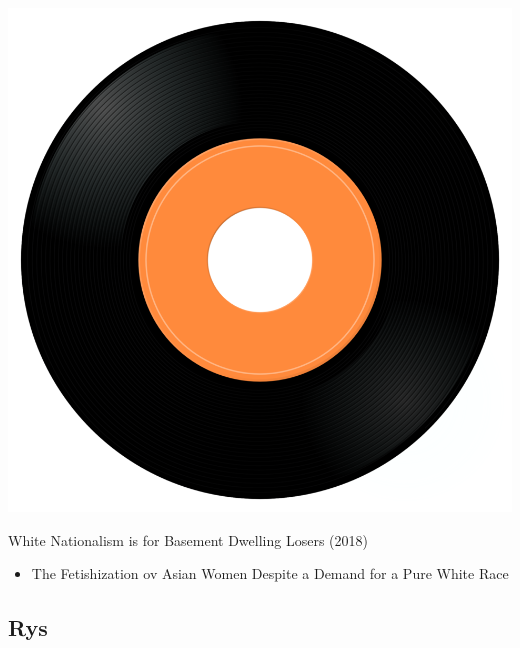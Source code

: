 \begin{minipage}[t]{0.25\textwidth}\vspace{0pt}
\captionsetup{type=figure}
\includegraphics[width=\textwidth]{Images/cover.png}
\caption*{White Nationalism is for Basement Dwelling Losers (2018)}
\end{minipage}
\begin{minipage}[t]{0.25\textwidth}\vspace{0pt}
\begin{itemize}[nosep,leftmargin=1em,labelwidth=*,align=left]
	\setlength{\itemsep}{0pt}
	\item The Fetishization ov Asian Women Despite a Demand for a Pure White Race
\end{itemize}
\end{minipage}

\subsection{Rys}

